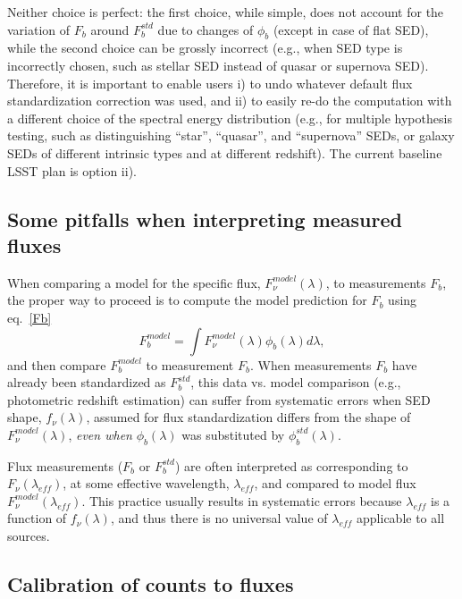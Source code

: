 \documentclass[DM,toc]{lsstdoc}
\begin{document}
Neither choice is perfect: the first choice, while simple, does not account for the variation of $F_b$ around
$F^{std}_b$ due to changes of $\phi_b$ (except in case of flat SED), while the second choice
can be grossly incorrect (e.g., when SED type is incorrectly chosen, such as stellar SED instead
of quasar or supernova SED). Therefore, it is important to enable users i) to undo whatever default
flux standardization correction was used, and ii) to easily re-do the computation with a different choice
of the spectral energy distribution (e.g., for multiple hypothesis testing, such as distinguishing
``star'', ``quasar'', and ``supernova'' SEDs, or galaxy SEDs of different intrinsic types and at
different redshift). The current baseline LSST plan is option ii).

\subsection{Some pitfalls when interpreting measured fluxes}

When comparing a model for the specific flux, $F_\nu^{model}(\lambda)$, to
measurements $F_b$, the proper way to proceed is to compute the model prediction
for $F_b$ using eq.~\ref{Fb}
\begin{equation}
\label{FbModel}
             F^{model}_b = \int{F_\nu^{model}(\lambda) \phi_b(\lambda) d\lambda},
\end{equation}
and then compare $F^{model}_b$ to measurement $F_b$.
When measurements $F_b$ have already been standardized as $F^{std}_b$,
this data vs. model comparison (e.g., photometric redshift estimation) can
suffer from systematic errors when SED shape, $f_\nu(\lambda)$,  assumed
for flux standardization differs from the shape of $F_\nu^{model}(\lambda)$,
\textit{even when} $\phi_b(\lambda)$ was substituted by $\phi^{std}_b(\lambda)$.

Flux measurements ($F_b$ or $F^{std}_b$) are often interpreted as corresponding to
$F_\nu(\lambda_{eff})$, at some effective wavelength, $\lambda_{eff}$, and compared
to model flux $F_\nu^{model}(\lambda_{eff})$. This practice usually results in systematic
errors because $\lambda_{eff}$ is a function of $f_\nu(\lambda)$, and thus there
is no universal value of $\lambda_{eff}$ applicable to all sources.


\subsection{Calibration of counts to fluxes}
\end{document}
